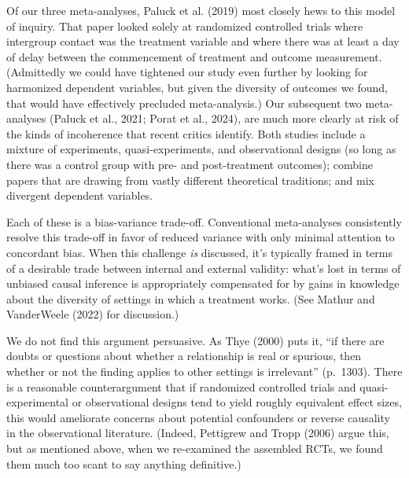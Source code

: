 \documentclass[
  ,jou]{apa6}
\begin{document}
Of our three meta-analyses, Paluck et al. (2019) most closely hews to this model of inquiry. That paper looked solely at randomized controlled trials where intergroup contact was the treatment variable and where there was at least a day of delay between the commencement of treatment and outcome measurement. (Admittedly we could have tightened our study even further by looking for harmonized dependent variables, but given the diversity of outcomes we found, that would have effectively precluded meta-analysis.) Our subsequent two meta-analyses (Paluck et al., 2021; Porat et al., 2024), are much more clearly at risk of the kinds of incoherence that recent critics identify. Both studies include a mixture of experiments, quasi-experiments, and observational designs (so long as there was a control group with pre- and post-treatment outcomes); combine papers that are drawing from vastly different theoretical traditions; and mix divergent dependent variables.

Each of these is a bias-variance trade-off. Conventional meta-analyses consistently resolve this trade-off in favor of reduced variance with only minimal attention to concordant bias. When this challenge \emph{is} discussed, it's typically framed in terms of a desirable trade between internal and external validity: what's lost in terms of unbiased causal inference is appropriately compensated for by gains in knowledge about the diversity of settings in which a treatment works. (See Mathur and VanderWeele (2022) for discussion.)

We do not find this argument persuasive. As Thye (2000) puts it, ``if there are doubts or questions about whether a relationship is real or spurious, then whether or not the finding applies to other settings is irrelevant'' (p.~1303). There is a reasonable counterargument that if randomized controlled trials and quasi-experimental or observational designs tend to yield roughly equivalent effect sizes, this would ameliorate concerns about potential confounders or reverse causality in the observational literature. (Indeed, Pettigrew and Tropp (2006) argue this, but as mentioned above, when we re-examined the assembled RCTs, we found them much too scant to say anything definitive.)
\end{document}

